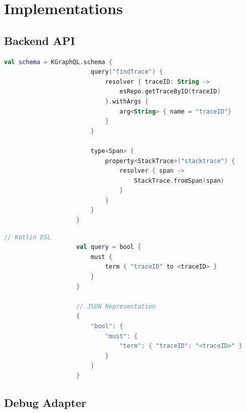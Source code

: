 \documentclass[12pt,pdftex,titlepage]{report}
\begin{document}

        \newpage          
        \section{Implementations}    
            \subsection{Backend API}
                \begin{lstlisting}[caption=Kotlin snippet of defining the GraphQL schema using the Kotlin DSL., language=Kotlin, gobble=20]
                    val schema = KGraphQL.schema { 
                        query("findTrace") { 
                            resolver { traceID: String ->
                                esRepo.getTraceByID(traceID)
                            }.withArgs { 
                                arg<String> { name = "traceID"}
                            }
                        }

                        type<Span> {
                            property<StackTrace>("stacktrace") { 
                                resolver { span ->
                                    StackTrace.fromSpan(span)
                                }
                            }
                        }
                    }                
                \end{lstlisting}

                \begin{lstlisting}[caption={Comparison between Elasticsearch query using Kotlin DSL and the query in its JSON representation, where $\langle$traceID$\rangle$ refers
                    to a variable storing the trace identifier.}, language=Kotlin, gobble=20]
                    // Kotlin DSL
                    val query = bool {
                        must {
                            term { "traceID" to <traceID> }
                        }
                    }

                    // JSON Representation
                    {
                        "bool": {
                            "must": {
                                "term": { "traceID": "<traceID>" }
                            }
                        }
                    }
                \end{lstlisting}
            \subsection{Debug Adapter}
\end{document}
